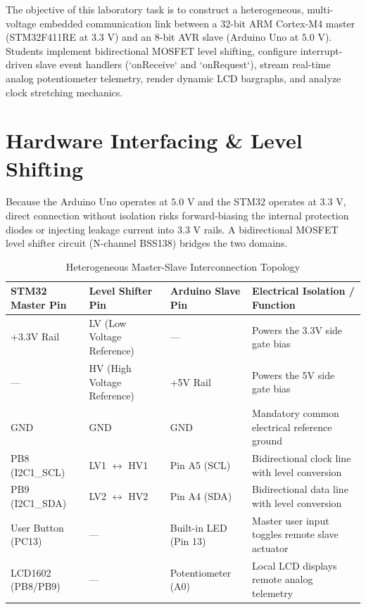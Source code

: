 \documentclass[11pt,a4paper]{article}
\begin{document}

\begin{objectivebox}
The objective of this laboratory task is to construct a heterogeneous, multi-voltage embedded communication link between a 32-bit ARM Cortex-M4 master (STM32F411RE at $3.3\text{ V}$) and an 8-bit AVR slave (Arduino Uno at $5.0\text{ V}$). Students implement bidirectional MOSFET level shifting, configure interrupt-driven slave event handlers (`onReceive` and `onRequest`), stream real-time analog potentiometer telemetry, render dynamic LCD bargraphs, and analyze clock stretching mechanics.
\end{objectivebox}

\section{Hardware Interfacing \& Level Shifting}
Because the Arduino Uno operates at $5.0\text{ V}$ and the STM32 operates at $3.3\text{ V}$, direct connection without isolation risks forward-biasing the internal protection diodes or injecting leakage current into $3.3\text{ V}$ rails. A bidirectional MOSFET level shifter circuit (N-channel BSS138) bridges the two domains.

\begin{table}[h!]
\centering
\small
\caption{Heterogeneous Master-Slave Interconnection Topology}
\vspace{4pt}
\begin{tabularx}{\textwidth}{l l l X}
\toprule
\textbf{STM32 Master Pin} & \textbf{Level Shifter Pin} & \textbf{Arduino Slave Pin} & \textbf{Electrical Isolation / Function} \\
\midrule
+3.3V Rail & LV (Low Voltage Reference) & --- & Powers the 3.3V side gate bias \\
--- & HV (High Voltage Reference) & +5V Rail & Powers the 5V side gate bias \\
GND & GND & GND & Mandatory common electrical reference ground \\
PB8 (I2C1\_SCL) & LV1 $\longleftrightarrow$ HV1 & Pin A5 (SCL) & Bidirectional clock line with level conversion \\
PB9 (I2C1\_SDA) & LV2 $\longleftrightarrow$ HV2 & Pin A4 (SDA) & Bidirectional data line with level conversion \\
User Button (PC13) & --- & Built-in LED (Pin 13) & Master user input toggles remote slave actuator \\
LCD1602 (PB8/PB9) & --- & Potentiometer (A0) & Local LCD displays remote analog telemetry \\
\bottomrule
\end{tabularx}
\end{table}
\end{document}
